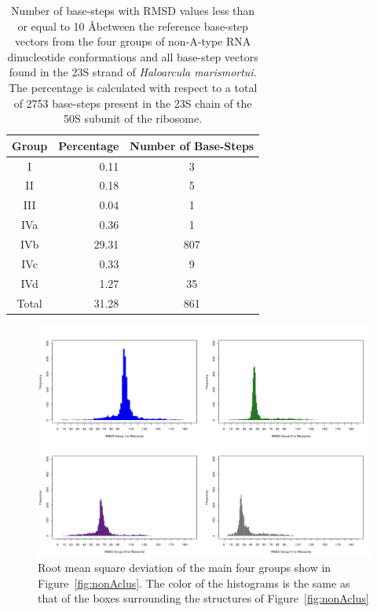 \begin{table}[htbp]
\begin{center}
{\footnotesize
\begin{tabular}{c|r|c}
\hline
\bf{Group} & \bf{Percentage} & \bf{Number of Base-Steps}\\ \hline
I   & 0.11  & 3   \\ \hline
II  & 0.18  & 5  \\ \hline
III & 0.04  & 1  \\ \hline
IVa & 0.36  & 1  \\ \hline
IVb & 29.31 & 807 \\ \hline
IVc & 0.33  & 9  \\ \hline
IVd & 1.27  & 35 \\ \hline \hline
Total & 31.28 & 861   \\ \hline
\end{tabular}
}
\caption{Number of base-steps  with RMSD values less than  or equal to
  10 \AA between the reference  base-step vectors from the four groups
  of  non-A-type  RNA  dinucleotide  conformations and  all  base-step
  vectors found in the  23S strand of \textit{Haloarcula marismortui}.
  The  percentage  is calculated  with  respect  to  a total  of  2753
  base-steps  present in  the  23S chain  of  the 50S  subunit of  the
  ribosome.}
\label{tab:nonA}
\end{center}
\end{table}

\begin{figure}[htbp]
 \centering
\includegraphics[angle=90, scale=0.6]{Chapter2/RMSDschneider1.png}
\caption{Root mean square deviation of the main four groups show in
  Figure~\ref{fig:nonAclus}. The color of the histograms is the same
  as that of the boxes surrounding the structures of
  Figure~\ref{fig:nonAclus}}
 \label{fig:histo1}
\end{figure}

